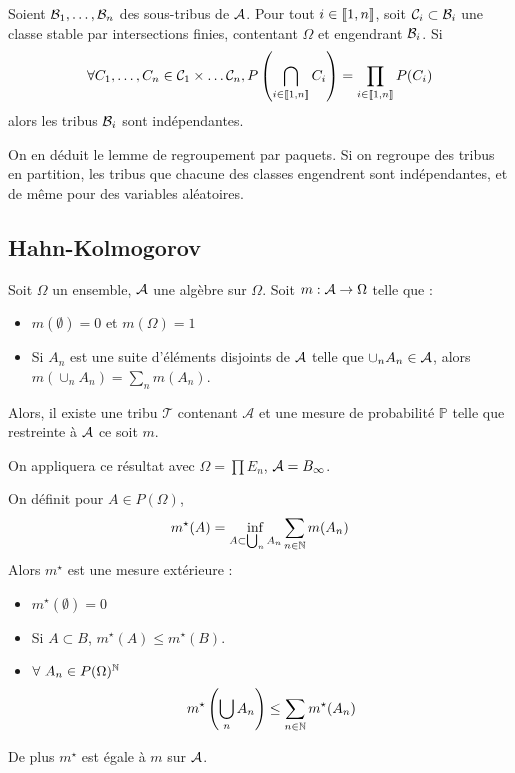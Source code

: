 \documentclass{cours}
\begin{document}
\begin{proposition}
    Soient $\mathcal{B}_{1}, \ldots, \mathcal{B}_{n}$ des sous-tribus de $\mathcal{A}$. Pour tout $i\in \left\llbracket 1, n\right\rrbracket$, soit $\mathcal{C}_{i} \subset \mathcal{B}_{i}$ une classe stable par intersections finies, contentant $\Omega$ et engendrant $\mathcal{B}_{i}$. Si
    \[
        \forall C_{1}, \ldots, C_{n} \in \mathcal{C}_{1} \times \ldots \mathcal{C}_{n}, P\left(\bigcap_{i \in \left\llbracket 1, n\right\rrbracket} C_{i}\right) = \prod_{i \in \left\llbracket 1, n\right\rrbracket}P(C_{i})
    \]
    alors les tribus $\mathcal{B}_{i}$ sont indépendantes.
\end{proposition}
\begin{corollary}
    On en déduit le lemme de regroupement par paquets. Si on regroupe des tribus en partition, les tribus que chacune des classes engendrent sont indépendantes, et de même pour des variables aléatoires.
\end{corollary}


\subsection{Hahn-Kolmogorov}
\begin{theorem}
    Soit $\Omega$ un ensemble, $\mathcal{A}$ une algèbre sur $\Omega$.
    Soit $m : \mathcal{A} \rightarrow \Omega$ telle que :
    \begin{itemize}
        \item $m(\emptyset) = 0$ et $m(\Omega) = 1$
        \item Si $A_{n}$ est une suite d'éléments disjoints de $\mathcal{A}$ telle que $\cup_{n} A_{n} \in \mathcal{A}$, alors $m\left(\cup_{n} A_{n}\right) = \sum_{n} m(A_{n})$.
    \end{itemize}
    Alors, il existe une tribu $\mathcal{T}$ contenant $\mathcal{A}$ et une mesure de probabilité $\mathbb{P}$ telle que restreinte à $\mathcal{A}$ ce soit $m$.
\end{theorem}
\begin{remark}
    On appliquera ce résultat avec $\Omega = \prod E_{n}$, $\mathcal{A} = B_{\infty}$.
\end{remark}

\begin{lemma}
    On définit pour $A \in P(\Omega)$, \[m^{\star}(A) = \inf_{A \subset \bigcup_{n} A_{n}} \sum_{n \in \mathbb{N}} m(A_{n})\]
    Alors $m^{\star}$ est une mesure extérieure :
    \begin{itemize}
        \item $m^{\star}(\emptyset) = 0$
        \item Si $A \subset B$, $m^{\star}(A) \leq m^{\star}(B)$.
        \item $\forall \ A_{n} \in P(\Omega)^{\mathbb{N}}$ \[
                  m^{\star}\left(\bigcup_{n} A_{n}\right) \leq \sum_{n \in \mathbb{N}} m^{\star}(A_{n})
              \]
    \end{itemize}
    De plus $m^{\star}$ est égale à $m$ sur $\mathcal{A}$.
\end{lemma}
\end{document}

